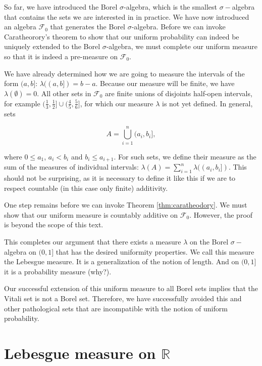 \documentclass{book}
\theoremstyle{plain}%
\theoremstyle{definition}
\begin{document}
So far, we have introduced the Borel $\sigma$-algebra, which is the smallest $\sigma-$algebra that contains the sets we are interested in in practice. We have now introduced an algebra $\mathcal{F}_0$ that generates the Borel $\sigma$-algebra. Before we can invoke Caratheorory's theorem to show that our uniform probability can indeed be uniquely extended to the Borel $\sigma$-algebra, we must complete our uniform measure so that it is indeed a pre-measure on $\mathcal{F}_0$.

We have already determined how we are going to measure the intervals of the form $(a, b]$: $\lambda((a, b]) = b - a$. Because our measure will be finite, we have $\lambda(\emptyset) = 0$. All other sets in $\mathcal{F}_0$ are finite unions of disjoints half-open intervals, for example $(\frac{1}{3}, \frac{1}{2}] \cup (\frac{4}{5}, \frac{5}{6}]$, for which our measure $\lambda$ is not yet defined. In general, sets

$$A = \bigcup_{i=1}^n (a_i, b_i],$$

where $0 \leq a_1$, $a_i < b_i$ and $b_i \leq a_{i+1}$. For such sets, we define their measure as the sum of the measures of individual intervals: $\lambda(A) = \sum_{i=1}^n \lambda((a_i, b_i])$. This should not be surprising, as it is necessary to define it like this if we are to respect countable (in this case only finite) additivity.

One step remains before we can invoke Theorem \ref{thm:caratheodory}. We must show that our uniform measure is countably additive on $\mathcal{F}_0$. However, the proof is beyond the scope of this text.

This completes our argument that there exists a measure $\lambda$ on the Borel $\sigma-$algebra on $(0,1]$ that has the desired uniformity properties. We call this measure the Lebesgue measure. It is a generalization of the notion of length. And on $(0, 1]$ it is a probability measure (why?).

Our successful extension of this uniform measure to all Borel sets implies that the Vitali set is not a Borel set. Therefore, we have successfully avoided this and other pathological sets that are incompatible with the notion of uniform probability. %

\section{Lebesgue measure on $\mathbb{R}$}
\end{document}
